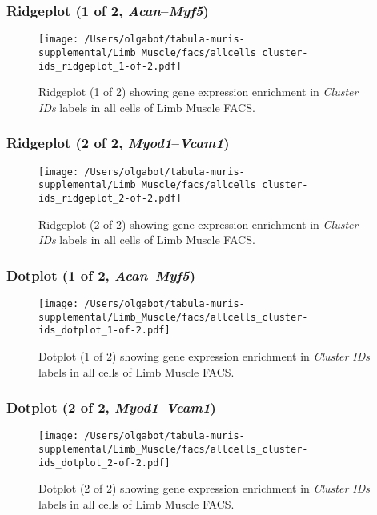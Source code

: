 \clearpage

\subsubsection{Ridgeplot (1 of 2, \emph{Acan}--\emph{Myf5})}
\begin{figure}[h]
\centering
\texttt{[image: /Users/olgabot/tabula-muris-supplemental/Limb\_Muscle/facs/allcells\_cluster-ids\_ridgeplot\_1-of-2.pdf]}

\caption{ Ridgeplot (1 of 2)  showing gene expression enrichment in \emph{Cluster IDs} labels in all cells of Limb Muscle FACS. }
\end{figure}


\clearpage

\subsubsection{Ridgeplot (2 of 2, \emph{Myod1}--\emph{Vcam1})}
\begin{figure}[h]
\centering
\texttt{[image: /Users/olgabot/tabula-muris-supplemental/Limb\_Muscle/facs/allcells\_cluster-ids\_ridgeplot\_2-of-2.pdf]}

\caption{ Ridgeplot (2 of 2)  showing gene expression enrichment in \emph{Cluster IDs} labels in all cells of Limb Muscle FACS. }
\end{figure}


\clearpage

\subsubsection{Dotplot (1 of 2, \emph{Acan}--\emph{Myf5})}
\begin{figure}[h]
\centering
\texttt{[image: /Users/olgabot/tabula-muris-supplemental/Limb\_Muscle/facs/allcells\_cluster-ids\_dotplot\_1-of-2.pdf]}

\caption{ Dotplot (1 of 2)  showing gene expression enrichment in \emph{Cluster IDs} labels in all cells of Limb Muscle FACS. }
\end{figure}


\clearpage

\subsubsection{Dotplot (2 of 2, \emph{Myod1}--\emph{Vcam1})}
\begin{figure}[h]
\centering
\texttt{[image: /Users/olgabot/tabula-muris-supplemental/Limb\_Muscle/facs/allcells\_cluster-ids\_dotplot\_2-of-2.pdf]}

\caption{ Dotplot (2 of 2)  showing gene expression enrichment in \emph{Cluster IDs} labels in all cells of Limb Muscle FACS. }
\end{figure}

